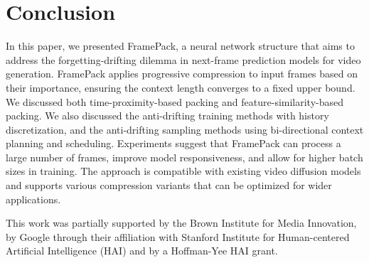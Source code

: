 \documentclass{article}
\begin{document}
\section{Conclusion}

In this paper, we presented FramePack, a neural network structure that aims to address the forgetting-drifting dilemma in next-frame prediction models for video generation. FramePack applies progressive compression to input frames based on their importance, ensuring the context length converges to a fixed upper bound. We discussed both time-proximity-based packing and feature-similarity-based packing. We also discussed the anti-drifting training methods with history discretization, and the anti-drifting sampling methods using bi-directional context planning and scheduling. Experiments suggest that FramePack can process a large number of frames, improve model responsiveness, and allow for higher batch sizes in training. The approach is compatible with existing video diffusion models and supports various compression variants that can be optimized for wider applications.

\begin{ack}
This work was partially supported by the Brown Institute for Media Innovation, by Google through their affiliation with Stanford Institute for Human-centered Artificial Intelligence (HAI) and by a Hoffman-Yee HAI grant.
\end{ack}



\end{document}
